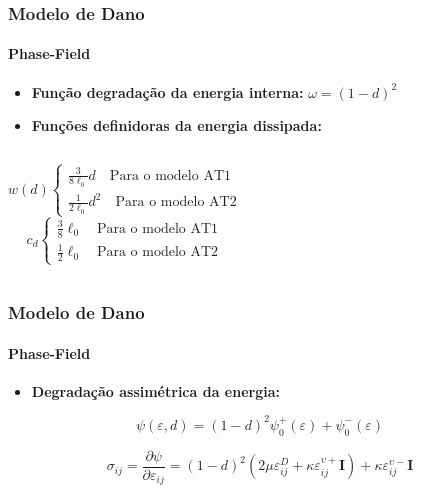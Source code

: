 \documentclass{beamer}
\begin{document}
\begin{frame}
    \frametitle{Modelo de Dano}
    \framesubtitle{Phase-Field}

    \begin{itemize}
        \item \textbf{Função degradação da energia interna:} \(\omega = \left(1 - d\right)^2\)
        \item \textbf{Funções definidoras da energia dissipada:}
    \end{itemize}

    \begin{columns}
        \[
            w(d)
            \left\{
            \begin{aligned}
                \frac{3}{8\ell_0}d \quad \text{Para o modelo AT1} \\
                \frac{1}{2\ell_0}d^2 \quad \text{Para o modelo AT2}
            \end{aligned}
            \right.
        \]
        \[
            c_d
            \left\{
            \begin{aligned}
                \frac{3}{8}\ell_0 \quad \text{Para o modelo AT1} \\
                \frac{1}{2}\ell_0 \quad \text{Para o modelo AT2}
            \end{aligned}
            \right.
        \]
    \end{columns}


\end{frame}


\begin{frame}
    \frametitle{Modelo de Dano}
    \framesubtitle{Phase-Field}

    \begin{itemize}
        \item \textbf{Degradação assimétrica da energia:} 
    \end{itemize}

    \begin{equation}
        \psi \left(\varepsilon, d\right) = \left(1 - d\right)^2\psi_0^+\left(\varepsilon\right)+\psi_0^-\left(\varepsilon\right)
    \end{equation} 

    \begin{equation}
        \sigma_{ij} = \frac{\partial \psi}{\partial \varepsilon_{ij}} = \left(1 - d\right)^2\left(2\mu \varepsilon_{ij}^D+\kappa\varepsilon_{ij}^{\upsilon+}\mathbf{I} \right) + \kappa \varepsilon_{ij}^{\upsilon-}\mathbf{I}
    \end{equation}


\end{frame}
\end{document}
